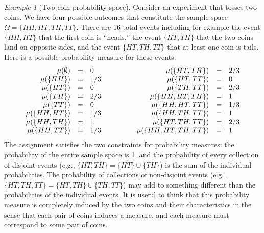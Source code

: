 \documentclass{article}
\theoremstyle{remark}
\newtheorem{example}{Example}
\newcommand{\pmeas}{\ensuremath{\mu}}
\begin{document}
\begin{example}[Two-coin probability space]
  Consider an experiment that tosses two coins. We have four possible
  outcomes that constitute the sample space
  $\Omega = \{ HH, HT, TH, TT \}$. There are 16 total events including
  for example the event $\{ HH, HT \}$ that the first coin is
  ``heads,'' the event $\{ HT, TH \}$ that the two coins land on
  opposite sides, and the event $\{ HT, TH, TT\}$ that at least one
  coin is tails. Here is a possible probability measure for these
  events:
\[\begin{array}{c@{\qquad\qquad}c}
\begin{array}{rcl}
\pmeas(\emptyset) &=& 0 \\
\pmeas(\{ HH \}) &=& 1/3 \\
\pmeas(\{ HT \}) &=& 0 \\
\pmeas(\{ TH \}) &=& 2/3 \\
\pmeas(\{ TT \}) &=& 0 \\
\pmeas(\{  HH, HT \}) &=& 1/3 \\
\pmeas(\{  HH, TH \}) &=& 1 \\
\pmeas(\{  HH , TT \}) &=& 1/3 
\end{array} & \begin{array}{rcl}
\pmeas(\{  HT, TH \}) &=& 2/3 \\
\pmeas(\{  HT , TT \}) &=& 0 \\
\pmeas(\{  TH , TT \}) &=& 2/3 \\
\pmeas(\{  HH, HT, TH \}) &=& 1 \\
\pmeas(\{  HH, HT, TT \}) &=& 1/3 \\
\pmeas(\{  HH, TH, TT \}) &=& 1 \\
\pmeas(\{  HT, TH, TT \}) &=& 2/3 \\
\pmeas(\{  HH, HT, TH, TT \}) &=& 1
\end{array}
\end{array}\]
The assignment satisfies the two constraints for probability measures:
the probability of the entire sample space is 1, and the probability
of every collection of disjoint events (e.g.,
$\{ HT, TH \} = \{ HT \} \cup \{ TH \}$) is the sum of the individual
probabilities. The probability of collections of non-disjoint events
(e.g., $\{ HT, TH, TT \} = \{ HT, TH \} \cup \{ TH , TT \}$) may add
to something different than the probabilities of the individual
events. It is useful to think that this probability measure is
completely induced by the two coins and their characteristics in the
sense that each pair of coins induces a measure, and each measure must
correspond to some pair of coins.
\end{example}
\end{document}
